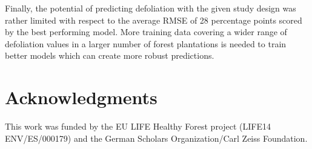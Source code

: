 \documentclass[journal]{IEEEtran}
\begin{document}
Finally, the potential of predicting defoliation with the given study design was rather limited with respect to the average RMSE of 28 percentage points scored by the best performing model.
More training data covering a wider range of defoliation values in a larger number of forest plantations is needed to train better models which can create more robust predictions.

\section{Acknowledgments}
This work was funded by the EU LIFE Healthy Forest project (LIFE14 ENV/ES/000179) and the German Scholars Organization/Carl Zeiss Foundation.

\appendices{}





\pagebreak
\end{document}
